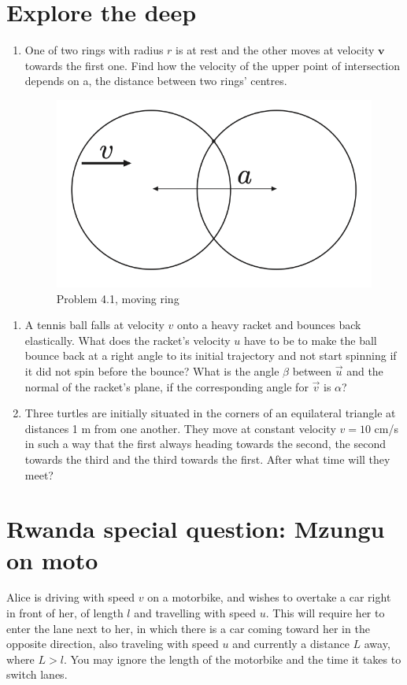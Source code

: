 \documentclass{article}
\begin{document}
\section{Explore the deep}
\begin{enumerate}
    \item One of two rings with radius $r$ is at rest and the other moves at velocity $\mathbf{v}$ towards the first one. Find how the velocity of the upper point of intersection depends on a, the distance between two rings’ centres.
\begin{figure}
    \centering
    \includegraphics[width=0.5\linewidth]{assets/Screenshot 2024-09-06 at 16.41.18.png}
    \caption{Problem 4.1, moving ring}
    \label{fig:enter-label}

\end{figure}
\end{enumerate}
\begin{enumerate}[resume]
    \item A tennis ball falls at velocity $v$ onto a heavy racket and bounces back elastically. What does the racket’s velocity $u$ have to be to make the ball bounce back at a right angle to its initial trajectory and not start spinning if it did not spin before the bounce? What is the angle $\beta$ between $\vec{u}$ and the normal of the racket’s plane, if the corresponding angle for $\vec{v}$ is $\alpha$?
    \item Three turtles are initially situated in the corners of an equilateral triangle at distances 1 m from one another. They move at constant velocity $v = 10$ cm/s in such a way that the first always heading towards the second, the second towards the third and the third towards the first. After what time will they meet?
\end{enumerate}
\section{Rwanda special question: Mzungu on moto}
Alice is driving with speed $v$ on a motorbike, and wishes to overtake a car right in front of her, of length $l$ and travelling with speed $u$. This will require her to enter the lane next to her, in which there is a car coming toward her in the opposite direction, also traveling with speed $u$ and currently a distance $L$ away, where $L > l$. You may ignore the length of the motorbike and the time it takes to switch lanes.
\end{document}
